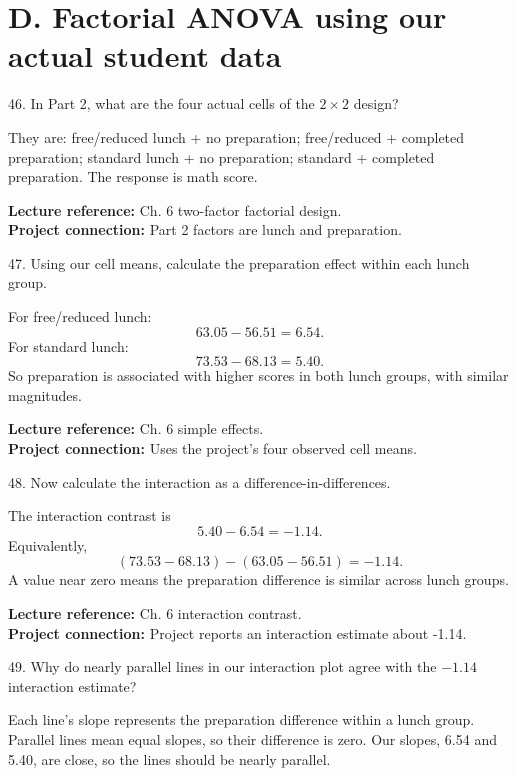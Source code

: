 \documentclass[10.5pt,a4paper]{article}
\newcommand{\chapref}[1]{\textbf{Lecture reference:} #1}
\newcommand{\projectref}[1]{\textbf{Project connection:} #1}
\begin{document}
\section*{D. Factorial ANOVA using our actual student data}
\begin{qbox}{46. In Part 2, what are the four actual cells of the $2\times2$ design?}
\end{qbox}
\begin{answerbox}They are: free/reduced lunch + no preparation; free/reduced + completed preparation; standard lunch + no preparation; standard + completed preparation. The response is math score.\end{answerbox}
\begin{refbox}\chapref{Ch. 6 two-factor factorial design.}\\\projectref{Part 2 factors are lunch and preparation.}\end{refbox}
\begin{qbox}{47. Using our cell means, calculate the preparation effect within each lunch group.}
\end{qbox}
\begin{answerbox}For free/reduced lunch:
\[
63.05-56.51=6.54.
\]
For standard lunch:
\[
73.53-68.13=5.40.
\]
So preparation is associated with higher scores in both lunch groups, with similar magnitudes.\end{answerbox}
\begin{refbox}\chapref{Ch. 6 simple effects.}\\\projectref{Uses the project's four observed cell means.}\end{refbox}
\begin{qbox}{48. Now calculate the interaction as a difference-in-differences.}
\end{qbox}
\begin{answerbox}The interaction contrast is
\[
5.40-6.54=-1.14.
\]
Equivalently,
\[
(73.53-68.13)-(63.05-56.51)=-1.14.
\]
A value near zero means the preparation difference is similar across lunch groups.\end{answerbox}
\begin{refbox}\chapref{Ch. 6 interaction contrast.}\\\projectref{Project reports an interaction estimate about -1.14.}\end{refbox}
\begin{qbox}{49. Why do nearly parallel lines in our interaction plot agree with the $-1.14$ interaction estimate?}
\end{qbox}
\begin{answerbox}Each line's slope represents the preparation difference within a lunch group. Parallel lines mean equal slopes, so their difference is zero. Our slopes, 6.54 and 5.40, are close, so the lines should be nearly parallel.\end{answerbox}
\end{document}
